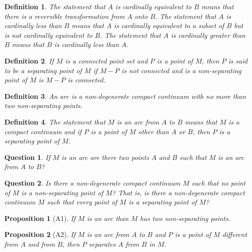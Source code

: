 \documentclass[10pt]{report}
\newtheorem*{proposition}{Proposition}
\newtheorem{definition}{Definition}
\newtheorem*{question}{Question}
\begin{document}
\begin{definition}
 The statement that $A$ is cardinally equivalent to $B$ means that there is a reversible transformation from $A$ onto
$B$. The statement that $A$ is cardinally less than $B$ means that $A$ is cardinally equivalent to a subset of $B$ but
is not cardinally equivalent to $B$. The statement that $A$ is cardinally greater than $B$ means that $B$ is cardinally
less than $A$.
\end{definition}

\begin{definition}
 If $M$ is a connected point set and $P$ is a point of $M$, then $P$ is said to be a separating point of $M$ if $M-P$ is
not connected and is a non-separating point of $M$ is $M-P$ is connected.
\end{definition}

\begin{definition}
 An arc is a non-degenerate compact continuum with no more than two non-separating points.
\end{definition}

\begin{definition}
 The statement that $M$ is an arc from $A$ to $B$ means that $M$ is a compact continuum and if $P$ is a point of $M$
other than $A$ or $B$, then $P$ is a separating point of $M$.
\end{definition}

\begin{question}
 If $M$ is an arc are there two points $A$ and $B$ such that $M$ is an arc from $A$ to $B$?
\end{question}

\begin{question}
 Is there a non-degenerate compact continuum $M$ such that no point of $M$ is a non-separating point of $M$? That is,
is there a non-degenerate compact continuum $M$ such that every point of $M$ is a separating point of $M$?
\end{question}

\begin{proposition}[A1]
If $M$ is an arc than $M$ has two non-separating points.
\end{proposition}


\begin{proposition}[A2]
 If $M$ is an arc from $A$ to $B$ and $P$ is a  point of $M$ different from $A$ and from $B$, then $P$ separates $A$
from $B$ in $M$.
\end{proposition}
\end{document}
